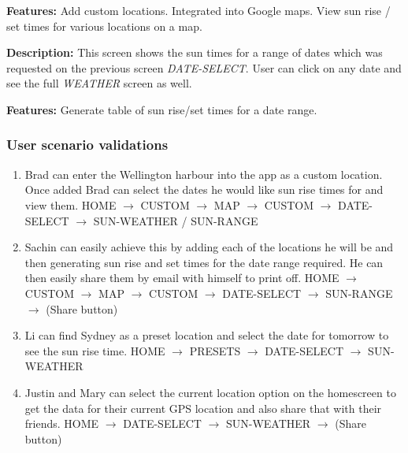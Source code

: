 \documentclass[11pt,english,numbers=endperiod,parskip=half]{scrartcl}
\begin{document}
\textbf{Features: }Add custom locations. Integrated into Google maps. View sun
rise / set times for various locations on a map.

\begin{figure}[H]
\end{figure}
\bigskip
\textbf{Description: }This screen shows the sun times for a range of dates which
was requested on the previous screen \textit{DATE-SELECT}. User can click on any
date and see the full \textit{WEATHER} screen as well.

\textbf{Features: }Generate table of sun rise/set times for a date range.

\subsubsection{User scenario validations}
\begin{enumerate}
	\item{Brad can enter the Wellington harbour into the app as a custom location.
	Once added Brad can select the dates he would like sun rise times for and view them.
	HOME $\rightarrow$ CUSTOM $\rightarrow$ MAP $\rightarrow$ CUSTOM $\rightarrow$ DATE-SELECT $\rightarrow$ SUN-WEATHER / SUN-RANGE}
	\item{Sachin can easily achieve this by adding each of the locations he will be
	and then generating sun rise and set times for the date range required. He can
	then easily share them by email with himself to print off.
	HOME $\rightarrow$ CUSTOM $\rightarrow$ MAP $\rightarrow$ CUSTOM $\rightarrow$ DATE-SELECT $\rightarrow$ SUN-RANGE $\rightarrow$ (Share button)}
	\item{Li can find Sydney as a preset location and select the date for tomorrow
	to see the sun rise time.
	HOME $\rightarrow$ PRESETS $\rightarrow$ DATE-SELECT $\rightarrow$ SUN-WEATHER}
	\item{Justin and Mary can select the current location option on the homescreen
	to get the data for their current GPS location and also share that with their
	friends.
	HOME $\rightarrow$ DATE-SELECT $\rightarrow$ SUN-WEATHER $\rightarrow$ (Share button)}
\end{enumerate}
\end{document}
